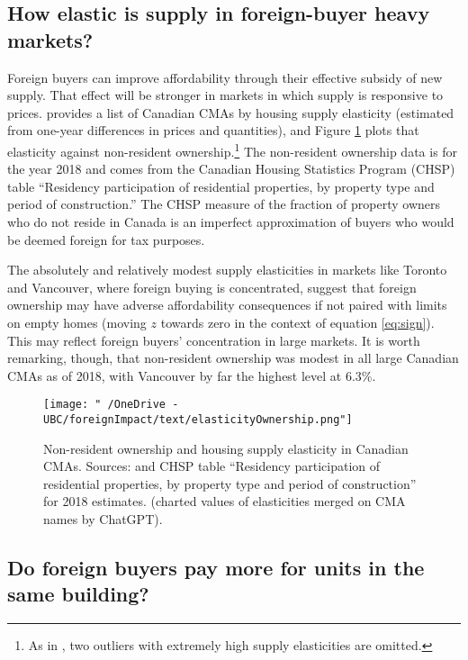 \documentclass[12pt]{article}
\begin{document}
\subsection{How elastic is supply in foreign-buyer heavy markets?}

Foreign buyers can improve affordability through their effective subsidy of new
supply. That effect will be stronger in markets in which supply is responsive
to prices. \textcite{paixao2021housing} provides a list of Canadian CMAs by
housing supply elasticity (estimated from one-year differences in prices and
quantities), and Figure \ref{fig:elasticityNonResident} plots that elasticity
against non-resident ownership.\footnote{As in \textcite{paixao2021housing}, two
outliers with extremely high supply elasticities are omitted.} The non-resident
ownership data is for the year 2018 and comes from the Canadian Housing
Statistics Program (CHSP) table ``Residency participation of residential
properties, by property type and period of construction.''  The CHSP measure of
the fraction of property owners who do not reside in Canada is an imperfect
approximation of buyers who would be deemed foreign for tax purposes.

The absolutely and relatively modest supply elasticities in markets like
Toronto and Vancouver, where foreign buying is concentrated, suggest that
foreign ownership may have adverse affordability consequences if not paired
with limits on empty homes (moving $z$ towards zero in the context of equation
\eqref{eq:sign}). This may reflect foreign buyers' concentration in large markets.
It is worth remarking, though, that non-resident ownership was modest in all
large Canadian CMAs as of 2018, with Vancouver by far the highest level at
6.3\%.

\begin{figure}
	\centering
	\texttt{[image: "~/OneDrive - UBC/foreignImpact/text/elasticityOwnership.png"]}
\caption{\label{fig:elasticityNonResident} Non-resident ownership and housing supply elasticity in Canadian CMAs. Sources: \textcite{paixao2021housing} and CHSP table ``Residency participation of residential properties, by property type and period of construction'' for 2018 estimates. (charted values of elasticities merged on CMA names by ChatGPT).}
\end{figure}

\subsection{Do foreign buyers pay more for units in the same building?}
\end{document}
